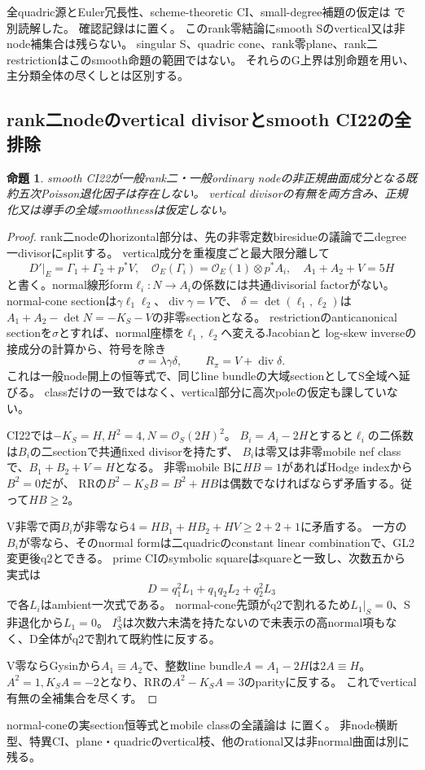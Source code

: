 \documentclass[a4paper,11pt]{ltjsarticle}
\newtheorem{proposition}{命題}[section]
\theoremstyle{definition}
\begin{document}
全quadric源とEuler冗長性、scheme-theoretic CI、small-degree補題の仮定は
で別読解した。
確認記録はに置く。
このrank零結論にsmooth Sのvertical又は非node補集合は残らない。
singular S、quadric cone、rank零plane、rank二restrictionはこのsmooth命題の範囲ではない。
それらのG上界は別命題を用い、主分類全体の尽くしとは区別する。

\subsection{rank二nodeのvertical divisorとsmooth CI22の全排除}
\begin{proposition}\label{prop:smooth-CI22-rank2-node}
smooth CI22が一般rank二・一般ordinary nodeの非正規曲面成分となる既約五次Poisson退化因子は存在しない。
vertical divisorの有無を両方含み、正規化又は導手の全域smoothnessは仮定しない。
\end{proposition}
\begin{proof}
rank二nodeのhorizontal部分は、先の非零定数biresidueの議論で二degree一divisorにsplitする。
vertical成分を重複度ごと最大限分離して
\[
 D'|_E=\Gamma_1+\Gamma_2+p^*V,\quad
 \mathcal O_E(\Gamma_i)=\mathcal O_E(1)\otimes p^*A_i,\quad A_1+A_2+V=5H
\]
と書く。normal線形form$\ell_i:N\to A_i$の係数には共通divisorial factorがない。
normal-cone sectionは$\gamma\ell_1\ell_2$、$\operatorname{div}\gamma=V$で、
$\delta=\det(\ell_1,\ell_2)$は$A_1+A_2-\det N=-K_S-V$の非零sectionとなる。
restrictionのanticanonical sectionを$\sigma$とすれば、normal座標を$\ell_1,\ell_2$へ変えるJacobianと
log-skew inverseの接成分の計算から、符号を除き
\[
 \sigma=\lambda\gamma\delta,\qquad R_\pi=V+\operatorname{div}\delta.
\]
これは一般node開上の恒等式で、同じline bundleの大域sectionとしてS全域へ延びる。
classだけの一致ではなく、vertical部分に高次poleの仮定も課していない。

CI22では$-K_S=H,H^2=4,N=\mathcal O_S(2H)^2$。
$B_i=A_i-2H$とすると$\ell_i$の二係数は$B_i$の二sectionで共通fixed divisorを持たず、
 $B_i$は零又は非零mobile nef classで、$B_1+B_2+V=H$となる。
非零mobile Bに$HB=1$があればHodge indexから$B^2=0$だが、
RRの$B^2-K_SB=B^2+HB$は偶数でなければならず矛盾する。従って$HB\ge2$。

V非零で両$B_i$が非零なら$4=HB_1+HB_2+HV\ge2+2+1$に矛盾する。
一方の$B_i$が零なら、そのnormal formは二quadricのconstant linear combinationで、GL2変更後q2とできる。
prime CIのsymbolic squareはsquareと一致し、次数五から実式は
\[
 D=q_1^2L_1+q_1q_2L_2+q_2^2L_3
\]
で各$L_i$はambient一次式である。
normal-cone先頭がq2で割れるため$L_1|_S=0$、S非退化から$L_1=0$。
$I_S^3$は次数六未満を持たないので未表示の高normal項もなく、D全体がq2で割れて既約性に反する。

V零ならGysinから$A_1\equiv A_2$で、整数line bundle$A=A_1-2H$は$2A\equiv H$。
$A^2=1,K_SA=-2$となり、RRの$A^2-K_SA=3$のparityに反する。
これでvertical有無の全補集合を尽くす。
\end{proof}
normal-coneの実section恒等式とmobile classの全議論は
に置く。
非node横断型、特異CI、plane・quadricのvertical枝、他のrational又は非normal曲面は別に残る。
\end{document}
